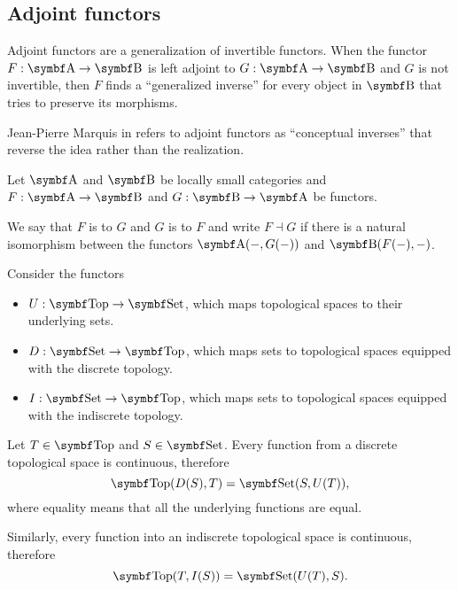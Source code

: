 \subsection{Adjoint functors}\label{subsec:adjoint_functors}

\begin{remark}\label{def:adjoint_functors}
  Adjoint functors are a generalization of invertible functors. When the functor \( F: \Bold A \to \Bold B \) is left adjoint to \( G: \Bold A \to \Bold B \) and \( G \) is not invertible, then \( F \) finds a \enquote{generalized inverse} for every object in \( \Bold B \) that tries to preserve its morphisms.

  Jean-Pierre Marquis in \cite{StanfordPlato:category_theory} refers to adjoint functors as \enquote{conceptual inverses} that reverse the idea rather than the realization.
\end{remark}

\begin{definition}\label{def:adjoint_functor}\cite[exercise 4.1.32]{Leinster2014}
  Let \( \Bold A \) and \( \Bold B \) be locally small categories and \( F: \Bold A \to \Bold B \) and \( G: \Bold B \to \Bold A \) be functors.

  We say that \( F \) is  to \( G \) and \( G \) is  to \( F \) and write \( F \dashv G \) if there is a natural isomorphism between the functors \( \Cat{A}(-, G(-)) \) and \( \Cat{B}(F(-), -) \).
\end{definition}

\begin{example}\label{ex:top_adjoint_functor}\cite[example 2.1.5]{Leinster2014}
  Consider the functors
  \begin{itemize}
    \item \( U: \Cat{Top} \to \Bold{Set} \), which maps topological spaces to their underlying sets.
    \item \( D: \Cat{Set} \to \Bold{Top} \), which maps sets to topological spaces equipped with the discrete topology.
    \item \( I: \Cat{Set} \to \Bold{Top} \), which maps sets to topological spaces equipped with the indiscrete topology.
  \end{itemize}

  Let \( T \in \Cat{Top} \) and \( S \in \Bold{Set} \). Every function from a discrete topological space is continuous, therefore
  \begin{equation*}
    \Cat{Top}(D(S), T) = \Cat{Set}(S, U(T)),
  \end{equation*}
  where equality means that all the underlying functions are equal.

  Similarly, every function into an indiscrete topological space is continuous, therefore
  \begin{equation*}
    \Cat{Top}(T, I(S)) = \Cat{Set}(U(T), S).
  \end{equation*}
\end{example}

